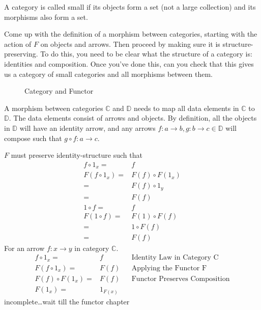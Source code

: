 \begin{definition}
	A category is called small if its objects form a set (not a large collection)
	and its morphisms also form a set.
\end{definition}
\begin{ttta}
	Come up with the definition of a morphism between categories, starting with the
	action of $F$ on objects and arrows. Then proceed by making sure it is
	structure-preserving. To do this, you need to be clear what the structure of a
	category is: identities and composition. Once you've done this, can you check
	that this gives us a category of small categories and all morphisms between
	them.
\end{ttta}
\begin{figure}[H]
	\begin{center}
		
	\end{center}
	\caption{Category and Functor}
\end{figure}
\begin{definition}
	A morphism between categories $\mathbb{C}$ and $\mathbb{D}$ needs to map all
	data elements in $\mathbb{C}$ to $\mathbb{D}$. The data elements consist of
	arrows and objects.
	By definition, all the objects in $\mathbb{D}$ will have an identity arrow, and
	any arrows $f:a\rightarrow b, g:b\rightarrow c\in\mathbb{D}$ will compose
	such that $g\circ f:a\rightarrow c$.
\end{definition}
\begin{proofitem}
	\item $F$ must preserve identity-structure such that
	\begin{align*}
		f \circ 1_x =    & f                 \\
		F(f \circ 1_x) = & F(f) \circ F(1_x) \\
		=                & F(f) \circ 1_y    \\
		=                & F(f)              \\
		1 \circ f =      & f                 \\
		F(1 \circ f) =   & F(1) \circ F(f)   \\
		=                & 1 \circ F(f)      \\
		=                & F(f)
	\end{align*}
	For an arrow $f: x \rightarrow y$ in category $\mathbb{C}$.
	\begin{align*}
		f \circ 1_x =       & f        &  & \text{Identity Law in Category C}    \\
		F(f \circ 1_x) =    & F(f)     &  & \text{Applying the Functor F}        \\
		F(f) \circ F(1_x) = & F(f)     &  & \text{Functor Preserves Composition} \\
		F(1_x) =            & 1_{F(x)}
	\end{align*}
	incomplete\ldots wait till the functor chapter
\end{proofitem}
